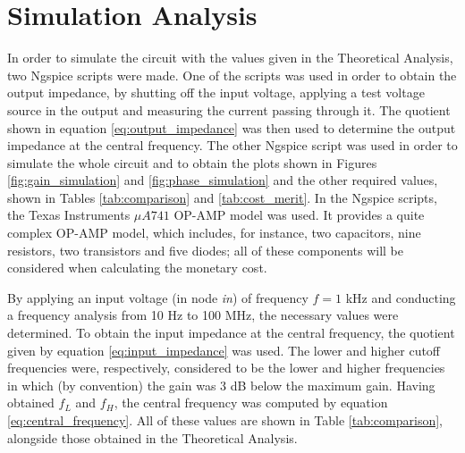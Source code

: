 \section{Simulation Analysis} \label{sec:simulation}

In order to simulate the circuit with the values given in the Theoretical Analysis, two Ngspice scripts were made. One of the scripts was used in order to obtain the output impedance, by shutting off the input voltage, applying a test voltage source in the output and measuring the current passing through it. The quotient shown in equation \ref{eq:output_impedance} was then used to determine the output impedance at the central frequency. The other Ngspice script was used in order to simulate the whole circuit and to obtain the plots shown in Figures \ref{fig:gain_simulation} and \ref{fig:phase_simulation} and the other required values, shown in Tables \ref{tab:comparison} and \ref{tab:cost_merit}. In the Ngspice scripts, the Texas Instruments $\mu A741$ OP-AMP model was used. It provides a quite complex OP-AMP model, which includes, for instance, two capacitors, nine resistors, two transistors and five diodes; all of these components will be considered when calculating the monetary cost.

\par

By applying an input voltage (in node \textit{in}) of frequency $f=1$ kHz and conducting a frequency analysis from 10 Hz to 100 MHz, the necessary values were determined. To obtain the input impedance at the central frequency, the quotient given by equation \ref{eq:input_impedance} was used. The lower and higher cutoff frequencies were, respectively, considered to be the lower and higher frequencies in which (by convention) the gain was 3 dB below the maximum gain. Having obtained $f_L$ and $f_H$, the central frequency was computed by equation \ref{eq:central_frequency}. All of these values are shown in Table \ref{tab:comparison}, alongside those obtained in the Theoretical Analysis.

